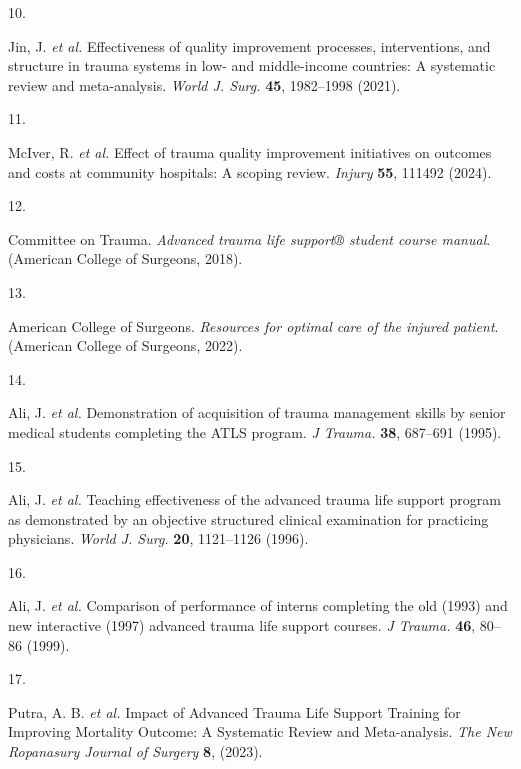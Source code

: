 \documentclass[
]{scrartcl}
\newlength{\cslhangindent}
\newlength{\csllabelwidth}
\newlength{\cslentryspacingunit} %
\newenvironment{CSLReferences}[2] %
 {%
  \setlength{\parindent}{0pt}
  \ifodd #1
  \let\oldpar\par
  \def\par{\hangindent=\cslhangindent\oldpar}
  \fi
  \setlength{\parskip}{#2\cslentryspacingunit}
 }%
 {}
\newcommand{\CSLLeftMargin}[1]{\parbox[t]{\csllabelwidth}{#1}}
\newcommand{\CSLRightInline}[1]{\parbox[t]{\linewidth - \csllabelwidth}{#1}\break}
\begin{document}
\begin{CSLReferences}{0}{0}
\leavevmode{}%
\CSLLeftMargin{10. }%
\CSLRightInline{Jin, J. \emph{et al.} Effectiveness of quality
improvement processes, interventions, and structure in trauma systems in
low- and middle-income countries: A systematic review and meta-analysis.
\emph{World J. Surg.} \textbf{45}, 1982--1998 (2021).}

\leavevmode{}%
\CSLLeftMargin{11. }%
\CSLRightInline{McIver, R. \emph{et al.} Effect of trauma quality
improvement initiatives on outcomes and costs at community hospitals:
{A} scoping review. \emph{Injury} \textbf{55}, 111492 (2024).}

\leavevmode{}%
\CSLLeftMargin{12. }%
\CSLRightInline{Committee on Trauma. \emph{Advanced trauma life support®
student course manual}. (American College of Surgeons, 2018).}

\leavevmode{}%
\CSLLeftMargin{13. }%
\CSLRightInline{American College of Surgeons. \emph{Resources for
optimal care of the injured patient}. ({American College of Surgeons},
2022).}

\leavevmode{}%
\CSLLeftMargin{14. }%
\CSLRightInline{Ali, J. \emph{et al.} Demonstration of acquisition of
trauma management skills by senior medical students completing the ATLS
program. \emph{J Trauma.} \textbf{38}, 687--691 (1995).}

\leavevmode{}%
\CSLLeftMargin{15. }%
\CSLRightInline{Ali, J. \emph{et al.} Teaching effectiveness of the
advanced trauma life support program as demonstrated by an objective
structured clinical examination for practicing physicians. \emph{World
J. Surg.} \textbf{20}, 1121--1126 (1996).}

\leavevmode{}%
\CSLLeftMargin{16. }%
\CSLRightInline{Ali, J. \emph{et al.} Comparison of performance of
interns completing the old (1993) and new interactive (1997) advanced
trauma life support courses. \emph{J Trauma.} \textbf{46}, 80--86
(1999).}

\leavevmode{}%
\CSLLeftMargin{17. }%
\CSLRightInline{Putra, A. B. \emph{et al.} Impact of {Advanced} {Trauma}
{Life} {Support} {Training} for {Improving} {Mortality} {Outcome}: {A}
{Systematic} {Review} and {Meta}-analysis. \emph{The New Ropanasury
Journal of Surgery} \textbf{8}, (2023).}


\end{CSLReferences}
\end{document}
